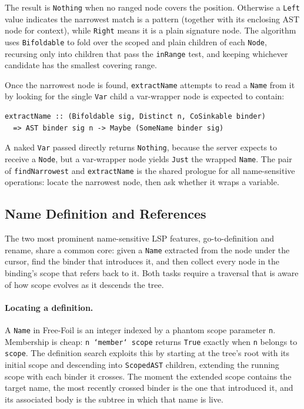 The result is \texttt{Nothing} when no ranged node covers the position.
Otherwise a \texttt{Left} value indicates the narrowest match is a pattern (together with its enclosing AST node for context), while \texttt{Right} means it is a plain signature node.
The algorithm uses \texttt{Bifoldable} to fold over the scoped and plain children of each \texttt{Node}, recursing only into children that pass the \texttt{inRange} test, and keeping whichever candidate has the smallest covering range.

Once the narrowest node is found, \texttt{extractName} attempts to read a \texttt{Name} from it by looking for the single \texttt{Var} child a var-wrapper node is expected to contain:

\begin{verbatim}
extractName :: (Bifoldable sig, Distinct n, CoSinkable binder)
  => AST binder sig n -> Maybe (SomeName binder sig)
\end{verbatim}

A naked \texttt{Var} passed directly returns \texttt{Nothing}, because the server expects to receive a \texttt{Node}, but a var-wrapper node yields \texttt{Just} the wrapped \texttt{Name}.
The pair of \texttt{findNarrowest} and \texttt{extractName} is the shared prologue for all name-sensitive operations: locate the narrowest node, then ask whether it wraps a variable.

\subsection{Name Definition and References}
\label{section:name_definition_and_references}

The two most prominent name-sensitive LSP features, go-to-definition and rename, share a common core: given a \texttt{Name} extracted from the node under the cursor, find the binder that introduces it, and then collect every node in the binding's scope that refers back to it.
Both tasks require a traversal that is aware of how scope evolves as it descends the tree.

\paragraph{Locating a definition.}
A \texttt{Name} in Free-Foil is an integer indexed by a phantom scope parameter \texttt{n}.
Membership is cheap: \texttt{n `member` scope} returns \texttt{True} exactly when \texttt{n} belongs to \texttt{scope}.
The definition search exploits this by starting at the tree's root with its initial scope and descending into \texttt{ScopedAST} children, extending the running scope with each binder it crosses.
The moment the extended scope contains the target name, the most recently crossed binder is the one that introduced it, and its associated body is the subtree in which that name is live.

